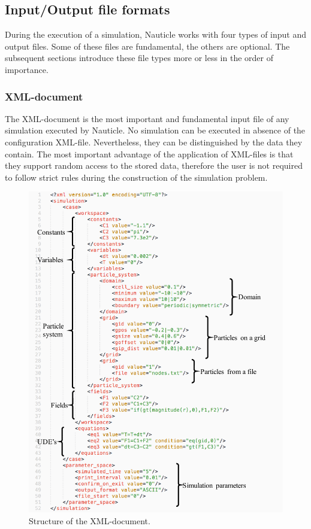 \documentclass[a4paper,12pt,openany]{book}
\theoremstyle{break}
\begin{document}
\subsection{Input/Output file formats}
During the execution of a simulation, Nauticle works with four types of input and output files. Some of these files are fundamental, the others are optional. The subsequent sections introduce these file types more or less in the order of importance.
\subsubsection{XML-document} \label{sec:XML}
The XML-document is the most important and fundamental input file of any simulation executed by Nauticle. No simulation can be executed in absence of the configuration XML-file. Nevertheless, they can be distinguished by the data they contain. The most important advantage of the application of XML-files is that they support random access to the stored data, therefore the user is not required to follow strict rules during the construction of the simulation problem.\\
\begin{figure}[H]
  \includegraphics[scale=1.05]{xml_intro.pdf}
  \centering
  \caption{Structure of the XML-document.}
  \label{fig:xml_intro}
\end{figure}\vspace*{3pt}
\end{document}
